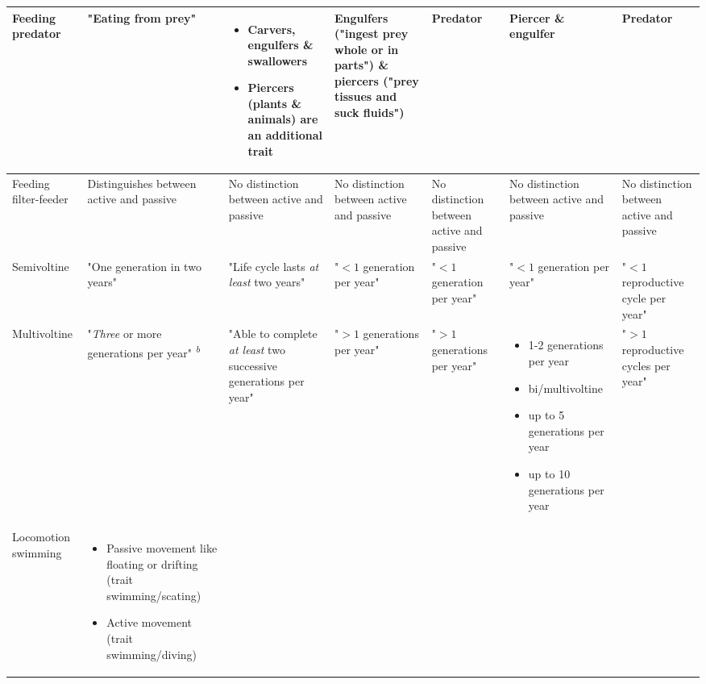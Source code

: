 \documentclass[../Draft_harmonization_paper.tex]{subfiles}
\begin{document}
\begin{landscape}
\begin{longtable}{m{1.8cm}|m{3cm}|m{3cm}|m{3cm}|m{3cm}|m{3cm}|m{3cm}}
        \\ 
        \midrule
        Feeding predator & 
        "Eating from prey" & 
        \begin{itemize}
            \item Carvers, engulfers \& swallowers
            \item Piercers (plants \& animals) are an additional trait
        \end{itemize} & %
        Engulfers ("ingest prey whole or in parts") \& 
        piercers ("prey tissues and suck fluids") & 
        Predator &
        Piercer \& engulfer &
        Predator
        \\ 
        \midrule
        Feeding filter-feeder & 
        Distinguishes between active and passive &
        No distinction between active and passive &
        No distinction between active and passive &
        No distinction between active and passive &
        No distinction between active and passive &
        No distinction between active and passive
        \\
        \toprule[.1em]
        Semivoltine & 
        "One generation in two years" & 
        "Life cycle lasts \textit{at least} two years" & 
        "$< 1$ generation per year" & 
        "$< 1$ generation per year" & 
        "$< 1$ generation per year" & 
        "$< 1$ reproductive cycle per year"
        \\
        \midrule
        Multivoltine & 
        "\textit{Three} or more generations per year" \textsuperscript{\textit{b}}& 
        "Able to complete \textit{at least} two successive generations per year" &
        "$> 1$ generations per year" &
        "$> 1$ generations per year" & 
        \begin{itemize}
            \item 1-2 generations per year
            \item bi/multivoltine
            \item up to 5 generations per year
            \item up to 10 generations per year
        \end{itemize}
        & 
        "$> 1$ reproductive cycles per year"
        \\
        \toprule[.1em]
        Locomotion swimming & 
        \begin{itemize}
            \item Passive movement like floating or drifting (trait swimming/scating)
            \item Active movement (trait swimming/diving)

\end{itemize}
\end{longtable}
\end{landscape}
\end{document}
